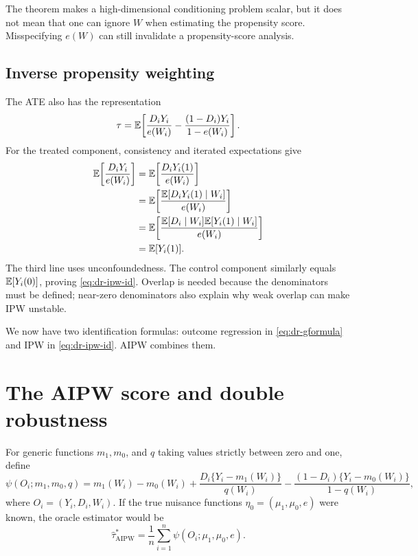 The theorem makes a high-dimensional conditioning problem scalar, but it does not
mean that one can ignore $W$ when estimating the propensity score.  Misspecifying
$e(W)$ can still invalidate a propensity-score analysis.

\subsection{Inverse propensity weighting}

The ATE also has the representation
\begin{equation}
  \tau
  =\mathbb{E}\!\left[
      \frac{D_iY_i}{e(W_i)}
      -\frac{(1-D_i)Y_i}{1-e(W_i)}
    \right].
  \label{eq:dr-ipw-id}
\end{equation}
For the treated component, consistency and iterated expectations give
\begin{align*}
  \mathbb{E}\!\left[\frac{D_iY_i}{e(W_i)}\right]
  &=\mathbb{E}\!\left[\frac{D_iY_i(1)}{e(W_i)}\right]\\
  &=\mathbb{E}\!\left[
      \frac{\mathbb{E}[D_iY_i(1)\mid W_i]}{e(W_i)}
    \right]\\
  &=\mathbb{E}\!\left[
      \frac{\mathbb{E}[D_i\mid W_i]\mathbb{E}[Y_i(1)\mid W_i]}{e(W_i)}
    \right]\\
  &=\mathbb{E}[Y_i(1)].
\end{align*}
The third line uses unconfoundedness.  The control component similarly equals
$\mathbb{E}[Y_i(0)]$, proving \eqref{eq:dr-ipw-id}.  Overlap is needed because the
denominators must be defined; near-zero denominators also explain why weak overlap
can make IPW unstable.

We now have two identification formulas: outcome regression in
\eqref{eq:dr-gformula} and IPW in \eqref{eq:dr-ipw-id}.  AIPW combines them.

\section{The AIPW score and double robustness}
\label{sec:dr-aipw}

For generic functions $m_1,m_0$, and $q$ taking values strictly between zero and
one, define
\begin{equation}
  \psi(O_i;m_1,m_0,q)
  =m_1(W_i)-m_0(W_i)
   +\frac{D_i\{Y_i-m_1(W_i)\}}{q(W_i)}
   -\frac{(1-D_i)\{Y_i-m_0(W_i)\}}{1-q(W_i)},
  \label{eq:dr-score}
\end{equation}
where $O_i=(Y_i,D_i,W_i)$.  If the true nuisance functions
$\eta_0=(\mu_1,\mu_0,e)$ were known, the oracle estimator would be
\begin{equation}
  \widehat\tau^*_{\mathrm{AIPW}}
  =\frac1n\sum_{i=1}^n\psi(O_i;\mu_1,\mu_0,e).
  \label{eq:dr-oracle-aipw}
\end{equation}

